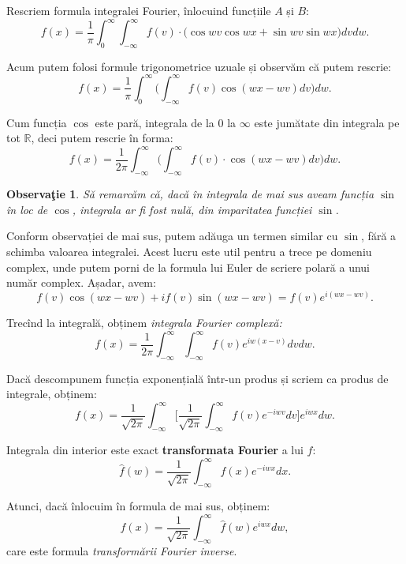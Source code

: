 \documentclass[12pt,a4paper]{article}
\newcommand\RR{\mathbb{R}}
\theoremstyle{dotless}
\theoremstyle{dotlessdr}
\newtheorem{remark}{Observa\c{t}ie}
\begin{document}
Rescriem formula integralei Fourier, înlocuind funcțiile $ A $ și $ B $:
\[
  f(x) = \frac{1}{\pi} \int_0^\infty \int_{-\infty}^\infty f(v) \cdot %
  \big( \cos wv \cos wx + \sin wv \sin wx \big) dvdw.
\]

Acum putem folosi formule trigonometrice uzuale și observăm că putem rescrie:
\[
  f(x) = \frac{1}{\pi} \int_0^\infty \Big( \int_{-\infty}^\infty %
  f(v) \cos (wx - wv) dv \Big) dw.
\]

Cum funcția $ \cos $ este pară, integrala de la $ 0 $ la $ \infty $ este jumătate
din integrala pe tot $ \RR $, deci putem rescrie în forma:
\[
  f(x) = \frac{1}{2\pi} \int_{-\infty}^\infty \Big( \int_{-\infty}^\infty f(v) \cdot %
  \cos (wx - wv) dv \Big) dw.
\]

\begin{remark}\label{rk:fourier-sin}
  Să remarcăm că, dacă în integrala de mai sus aveam funcția $ \sin $ în loc de $ \cos $,
  integrala ar fi fost nulă, din imparitatea funcției $ \sin $.
\end{remark}

Conform observației de mai sus, putem adăuga un termen similar cu $ \sin $, fără a
schimba valoarea integralei. Acest lucru este util pentru a trece pe domeniu
complex, unde putem porni de la formula lui Euler de scriere polară a unui număr
complex. Așadar, avem:
\[
  f(v) \cos (wx - wv) + if(v) \sin (wx - wv) = f(v) e^{i(wx - wv)}.
\]

Trecînd la integrală, obținem \emph{integrala Fourier complexă:}
\begin{equation}
  \label{eq:int-four-compx}
  f(x) = \frac{1}{2\pi} \int_{-\infty}^\infty \int_{-\infty}^\infty %
  f(v) e^{iw(x - v)} dvdw.
\end{equation}

Dacă descompunem funcția exponențială într-un produs și scriem ca produs de integrale,
obținem:
\[
  f(x) = \frac{1}{\sqrt{2\pi}} \int_{-\infty}^\infty \Big[ \frac{1}{\sqrt{2\pi}} %
  \int_{-\infty}^\infty f(v) e^{-iwv} dv \Big] e^{iwx} dw.
\]

Integrala din interior este exact \textbf{transformata Fourier} a lui $ f $:
\begin{equation}
  \label{eq:transf-f}
  \widehat{f}(w) = \frac{1}{\sqrt{2\pi}} \int_{-\infty}^\infty f(x) e^{-iwx} dx.
\end{equation}

Atunci, dacă înlocuim în formula de mai sus, obținem:
\begin{equation}
  \label{eq:transf-f-inv}
  f(x) = \frac{1}{\sqrt{2\pi}} \int_{-\infty}^\infty \widehat{f}(w) e^{iwx} dw,
\end{equation}
care este formula \emph{transformării Fourier inverse}.
\end{document}

